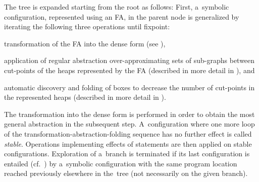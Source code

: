 The tree is expanded starting from the root as follows:
First, a~symbolic configuration, represented using an FA, in the parent node is generalized by iterating
the following three operations until fixpoint:
%
\begin{inparaenum}[(i)]
  \item  transformation of the FA into the dense form (see ),
  \item  application of regular abstraction over-ap\-prox\-imating sets of sub-graphs between
    cut-points of the heaps represented by the FA (described in more detail in
    ), and
  \item  automatic discovery and folding of boxes to decrease the number of
    cut-points in the represented heaps (described in more detail in
    ).
\end{inparaenum}
%
The transformation into the dense form is performed in order to obtain the most
general abstraction in the subsequent step.
A~configuration where one more loop of the transformation-abstraction-folding sequence has
no further effect is called \emph{stable}.
%
Operations implementing effects of statements are then applied on stable configurations.
%
Exploration of a~branch is terminated if its last configuration is entailed
(cf.~)
by a~symbolic configuration with the same program location reached previously 
elsewhere in the~tree (not necessarily on the given branch).

